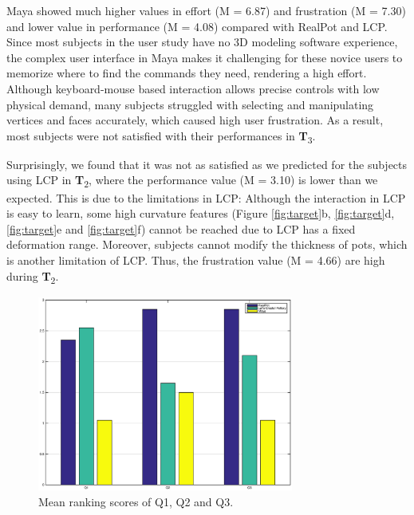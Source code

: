 \documentclass{svjour3}                     %
\begin{document}
Maya showed much higher values in effort (M = 6.87) and frustration (M = 7.30) and lower value in performance (M = 4.08) compared with RealPot and LCP.
Since most subjects in the user study have no 3D modeling software experience, the complex user interface in Maya makes it challenging for these novice users to memorize where to find the commands they need, rendering a high effort.
Although keyboard-mouse based interaction allows precise controls with low physical demand, many subjects struggled with selecting and manipulating vertices and faces accurately, which caused high user frustration. As a result, most subjects were not satisfied with their performances in \textbf{T}\textsubscript{3}.

Surprisingly, we found that it was not as satisfied as we predicted for the subjects using LCP in \textbf{T}\textsubscript{2}, where the performance value (M = 3.10) is lower than we expected. This is due to the limitations in LCP: Although the interaction in LCP is easy to learn, some high curvature features (Figure \ref{fig:target}b, \ref{fig:target}d, \ref{fig:target}e and \ref{fig:target}f) cannot be reached due to LCP has a fixed deformation range. Moreover, subjects cannot modify the thickness of pots, which is another limitation of LCP. Thus, the frustration value (M = 4.66) are high during \textbf{T}\textsubscript{2}.

\begin{figure}
	\includegraphics[width=0.75\textwidth]{fig15.eps}
	\caption{Mean ranking scores of Q1, Q2 and Q3.}
	\label{fig:ranking}
\end{figure}
\end{document}
